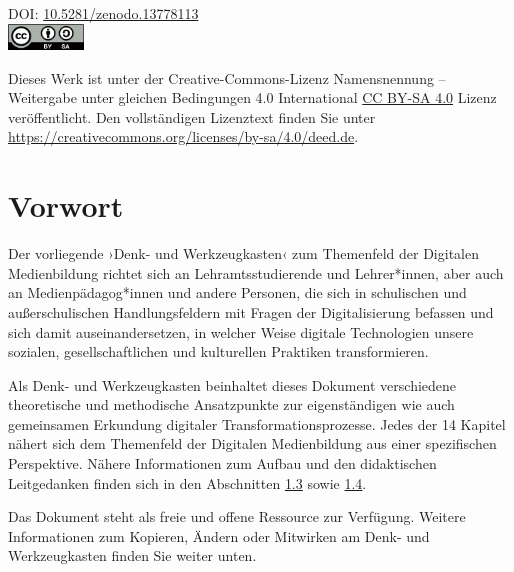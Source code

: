 \documentclass[
  a4paper,
]{book}
\begin{document}
\noindent DOI: \href{https://zenodo.org/records/13778113}{10.5281/zenodo.13778113}\\ %

\includegraphics[width=0.15\textwidth]{"Figures/by-sa.png"}\par\vspace{1cm}


\noindent Dieses Werk ist unter der Creative-Commons-Lizenz Namensnennung – Weitergabe unter gleichen Bedingungen 4.0 International \href{https://creativecommons.org/licenses/by-sa/4.0/}{CC BY-SA 4.0} Lizenz veröffentlicht. Den vollständigen Lizenztext finden Sie unter \href{https://creativecommons.org/licenses/by-sa/4.0/deed.de}{https://creativecommons.org/licenses/by-sa/4.0/deed.de}.\\ %


\newpage
{}

{
\setcounter{tocdepth}{1}
\tableofcontents
}
\chapter*{Vorwort}\label{vorwort}

Der vorliegende ›Denk- und Werkzeugkasten‹ zum Themenfeld der Digitalen Medienbildung richtet sich an Lehramtsstudierende und Lehrer*innen, aber auch an Medienpädagog*innen und andere Personen, die sich in schulischen und außerschulischen Handlungsfeldern mit Fragen der Digitalisierung befassen und sich damit auseinandersetzen, in welcher Weise digitale Technologien unsere sozialen, gesellschaftlichen und kulturellen Praktiken transformieren.

Als Denk- und Werkzeugkasten beinhaltet dieses Dokument verschiedene theoretische und methodische Ansatzpunkte zur eigenständigen wie auch gemeinsamen Erkundung digitaler Transformationsprozesse. Jedes der 14 Kapitel nähert sich dem Themenfeld der Digitalen Medienbildung aus einer spezifischen Perspektive. Nähere Informationen zum Aufbau und den didaktischen Leitgedanken finden sich in den Abschnitten \hyperref[keine-gebrauchsanweisung]{1.3} sowie \hyperref[inhalte-der-materialsammlung]{1.4}.

Das Dokument steht als freie und offene Ressource zur Verfügung. Weitere Informationen zum Kopieren, Ändern oder Mitwirken am Denk- und Werkzeugkasten finden Sie weiter unten.
\end{document}
